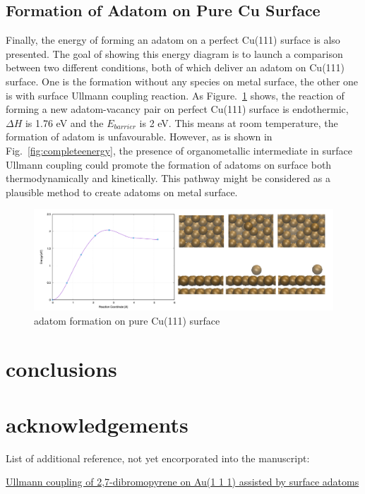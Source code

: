 \documentclass[%
 reprint,
 amsmath,amssymb,
 aps,
prb,
]{revtex4-2}
\begin{document}
\subsection{Formation of Adatom on Pure Cu Surface}

Finally, the energy of forming an adatom on a perfect Cu(111) surface is also presented. The goal of showing this energy diagram is to launch a comparison between two different conditions, both of which deliver an adatom on Cu(111) surface. One is the formation without any species on metal surface, the other one is with surface Ullmann coupling reaction.
As Figure.~\ref{fig:pureadatomform} shows, the reaction of forming a new adatom-vacancy pair on perfect Cu(111) surface is endothermic, $\Delta H$ is 1.76 eV and the $E_{barrier}$ is 2 eV. This means at room temperature, the formation of adatom is unfavourable. 
However, as is shown in Fig.~\ref{fig:completeenergy}, the presence of organometallic intermediate in surface Ullmann coupling could promote the formation of adatoms on surface both thermodynamically and kinetically. This pathway might be considered as a plausible method to create adatoms on metal surface.

\begin{figure}[hbt]
\centering
\includegraphics[width=1.0\textwidth]{Fig/pureadatomform.png}
\caption{adatom formation on pure Cu(111) surface}
\label{fig:pureadatomform}
\end{figure}

\section{conclusions}

\section{acknowledgements}






List of additional reference, not yet encorporated into the manuscript:

\href{https://doi.org/10.1016/j.apsusc.2020.145797}{Ullmann coupling of 2,7-dibromopyrene on Au(1 1 1) assisted by surface adatoms}










\nocite{*}

\end{document}
